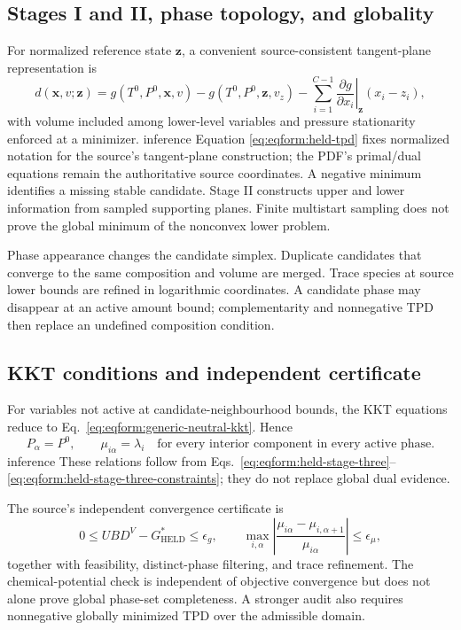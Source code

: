 \documentclass[11pt]{article}
\newcommand{\Evidence}[1]{\textsf{#1}}
\begin{document}
\subsection{Stages I and II, phase topology, and globality}

For normalized reference state \(\boldsymbol z\), a convenient
source-consistent tangent-plane representation is
\begin{equation}
 d(\boldsymbol x,v;\boldsymbol z)=
 g(T^0,P^0,\boldsymbol x,v)
 -g(T^0,P^0,\boldsymbol z,v_z)
 -\sum_{i=1}^{C-1}
 \left.\frac{\partial g}{\partial x_i}\right|_{\boldsymbol z}
 (x_i-z_i),
\label{eq:eqform:held-tpd}
\end{equation}
with volume included among lower-level variables and pressure stationarity
enforced at a minimizer. \Evidence{inference} Equation
\eqref{eq:eqform:held-tpd} fixes normalized notation for the source's
tangent-plane construction; the PDF's primal/dual equations remain the
authoritative source coordinates. A negative minimum identifies a missing
stable candidate. Stage II constructs upper and lower information from sampled
supporting planes. Finite multistart sampling does not prove the global minimum
of the nonconvex lower problem.

Phase appearance changes the candidate simplex. Duplicate candidates that
converge to the same composition and volume are merged. Trace species at source
lower bounds are refined in logarithmic coordinates. A candidate phase may
disappear at an active amount bound; complementarity and nonnegative TPD then
replace an undefined composition condition.

\subsection{KKT conditions and independent certificate}

For variables not active at candidate-neighbourhood bounds, the KKT equations
reduce to Eq.~\eqref{eq:eqform:generic-neutral-kkt}. Hence
\begin{equation}
 P_\alpha=P^0,\qquad
 \mu_{i\alpha}=\lambda_i
 \quad\text{for every interior component in every active phase}.
\label{eq:eqform:held-interior-kkt}
\end{equation}
\Evidence{inference} These relations follow from
Eqs.~\eqref{eq:eqform:held-stage-three}--%
\eqref{eq:eqform:held-stage-three-constraints}; they do not replace global dual
evidence.

The source's independent convergence certificate is
\begin{equation}
 0\leq UBD^{V}-G_{\mathrm{HELD}}^{*}\leq\epsilon_g,\qquad
 \max_{i,\alpha}
 \left|\frac{\mu_{i\alpha}-\mu_{i,\alpha+1}}{\mu_{i\alpha}}\right|
 \leq\epsilon_\mu,
\label{eq:eqform:held-certificate}
\end{equation}
together with feasibility, distinct-phase filtering, and trace refinement.
The chemical-potential check is independent of objective convergence but does
not alone prove global phase-set completeness. A stronger audit also requires
nonnegative globally minimized TPD over the admissible domain.
\end{document}
